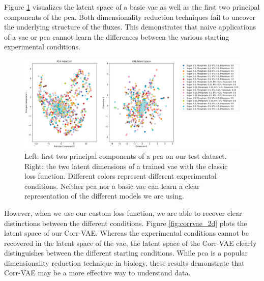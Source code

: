 Figure \ref{fig:vae_pca} visualizes the latent space of a basic \gls{vae} as well as the first two principal components of the \gls{pca}.
Both dimensionality reduction techniques fail to uncover the underlying structure of the fluxes.
This demonstrates that naive applications of a \gls{vae} or \gls{pca} cannot learn the differences between the various starting experimental conditions.

\begin{figure}[t!]
\begin{center}
\includegraphics[width=1.2\textwidth]{figs/vae_vs_pca_latent.png}
\caption[Comparison of the latent dimensions \gls{pca} and \gls{vae}]{Left: first two principal components of a \gls{pca} on our test dataset.
Right: the two latent dimensions of a trained \gls{vae} with the classic loss function.
Different colors represent different experimental conditions.
Neither \gls{pca} nor a basic \gls{vae} can learn a clear representation of the different models we are using.}
\label{fig:vae_pca}
\end{center}
\end{figure}

However, when we use our custom loss function, we are able to recover clear distinctions between the different conditions.
Figure \ref{fig:corrvae_2d} plots the latent space of our Corr-VAE.
Whereas the experimental conditions cannot be recovered in the latent space of the \gls{vae}, the latent space of the Corr-VAE clearly distinguishes between the different starting conditions.
While \gls{pca} is a popular dimensionality reduction technique in biology, these results demonstrate that Corr-VAE may be a more effective way to understand data.

